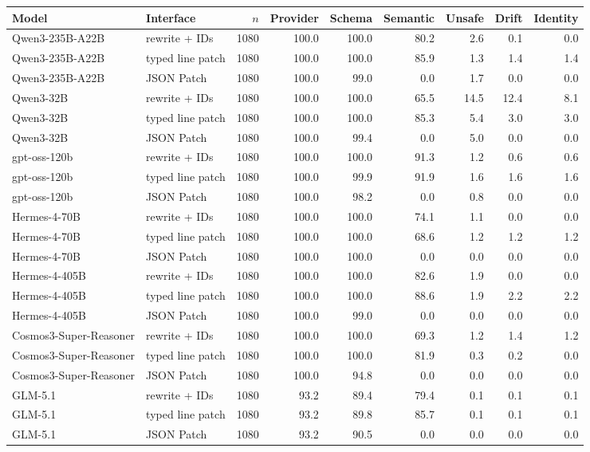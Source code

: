 \begin{tabular}{llrrrrrrr}
\toprule
Model & Interface & $n$ & Provider & Schema & Semantic & Unsafe & Drift & Identity \\
\midrule
Qwen3-235B-A22B & rewrite + IDs & 1080 & 100.0 & 100.0 & 80.2 & 2.6 & 0.1 & 0.0 \\
Qwen3-235B-A22B & typed line patch & 1080 & 100.0 & 100.0 & 85.9 & 1.3 & 1.4 & 1.4 \\
Qwen3-235B-A22B & JSON Patch & 1080 & 100.0 & 99.0 & 0.0 & 1.7 & 0.0 & 0.0 \\
Qwen3-32B & rewrite + IDs & 1080 & 100.0 & 100.0 & 65.5 & 14.5 & 12.4 & 8.1 \\
Qwen3-32B & typed line patch & 1080 & 100.0 & 100.0 & 85.3 & 5.4 & 3.0 & 3.0 \\
Qwen3-32B & JSON Patch & 1080 & 100.0 & 99.4 & 0.0 & 5.0 & 0.0 & 0.0 \\
gpt-oss-120b & rewrite + IDs & 1080 & 100.0 & 100.0 & 91.3 & 1.2 & 0.6 & 0.6 \\
gpt-oss-120b & typed line patch & 1080 & 100.0 & 99.9 & 91.9 & 1.6 & 1.6 & 1.6 \\
gpt-oss-120b & JSON Patch & 1080 & 100.0 & 98.2 & 0.0 & 0.8 & 0.0 & 0.0 \\
Hermes-4-70B & rewrite + IDs & 1080 & 100.0 & 100.0 & 74.1 & 1.1 & 0.0 & 0.0 \\
Hermes-4-70B & typed line patch & 1080 & 100.0 & 100.0 & 68.6 & 1.2 & 1.2 & 1.2 \\
Hermes-4-70B & JSON Patch & 1080 & 100.0 & 100.0 & 0.0 & 0.0 & 0.0 & 0.0 \\
Hermes-4-405B & rewrite + IDs & 1080 & 100.0 & 100.0 & 82.6 & 1.9 & 0.0 & 0.0 \\
Hermes-4-405B & typed line patch & 1080 & 100.0 & 100.0 & 88.6 & 1.9 & 2.2 & 2.2 \\
Hermes-4-405B & JSON Patch & 1080 & 100.0 & 99.0 & 0.0 & 0.0 & 0.0 & 0.0 \\
Cosmos3-Super-Reasoner & rewrite + IDs & 1080 & 100.0 & 100.0 & 69.3 & 1.2 & 1.4 & 1.2 \\
Cosmos3-Super-Reasoner & typed line patch & 1080 & 100.0 & 100.0 & 81.9 & 0.3 & 0.2 & 0.0 \\
Cosmos3-Super-Reasoner & JSON Patch & 1080 & 100.0 & 94.8 & 0.0 & 0.0 & 0.0 & 0.0 \\
GLM-5.1 & rewrite + IDs & 1080 & 93.2 & 89.4 & 79.4 & 0.1 & 0.1 & 0.1 \\
GLM-5.1 & typed line patch & 1080 & 93.2 & 89.8 & 85.7 & 0.1 & 0.1 & 0.1 \\
GLM-5.1 & JSON Patch & 1080 & 93.2 & 90.5 & 0.0 & 0.0 & 0.0 & 0.0 \\
\bottomrule
\end{tabular}
